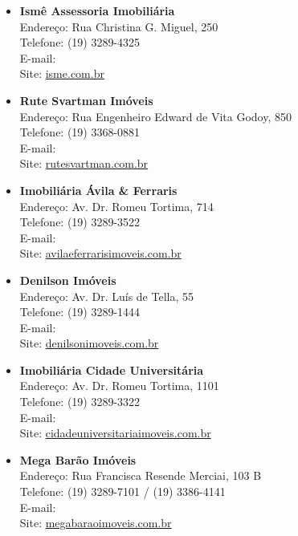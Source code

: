 \begin{itemize}
    \item   \textbf{Ismê Assessoria Imobiliária}
        \\Endereço: Rua Christina G. Miguel, 250
        \\Telefone: (19) 3289-4325
        \\E-mail: 
        \\Site: \url{isme.com.br}

    \item   \textbf{Rute Svartman Imóveis}
        \\Endereço: Rua Engenheiro Edward de Vita Godoy, 850
        \\Telefone: (19) 3368-0881
        \\E-mail: 
        \\Site: \url{rutesvartman.com.br}

    \item   \textbf{Imobiliária Ávila \& Ferraris}
        \\Endereço: Av. Dr. Romeu Tortima, 714
        \\Telefone: (19) 3289-3522
        \\E-mail: 
        \\Site: \url{avilaeferrarisimoveis.com.br}

    \item   \textbf{Denilson Imóveis}
        \\Endereço: Av. Dr. Luís de Tella, 55
        \\Telefone: (19) 3289-1444
        \\E-mail: 
        \\Site: \url{denilsonimoveis.com.br}

    \item   \textbf{Imobiliária Cidade Universitária}
        \\Endereço: Av. Dr. Romeu Tortima, 1101
        \\Telefone: (19) 3289-3322
        \\E-mail: 
        \\Site: \url{cidadeuniversitariaimoveis.com.br}

    \item   \textbf{Mega Barão Imóveis}
        \\Endereço: Rua Francisca Resende Merciai, 103 B
        \\Telefone: (19) 3289-7101 / (19) 3386-4141
        \\E-mail: 
        \\Site: \url{megabaraoimoveis.com.br}


\end{itemize}
